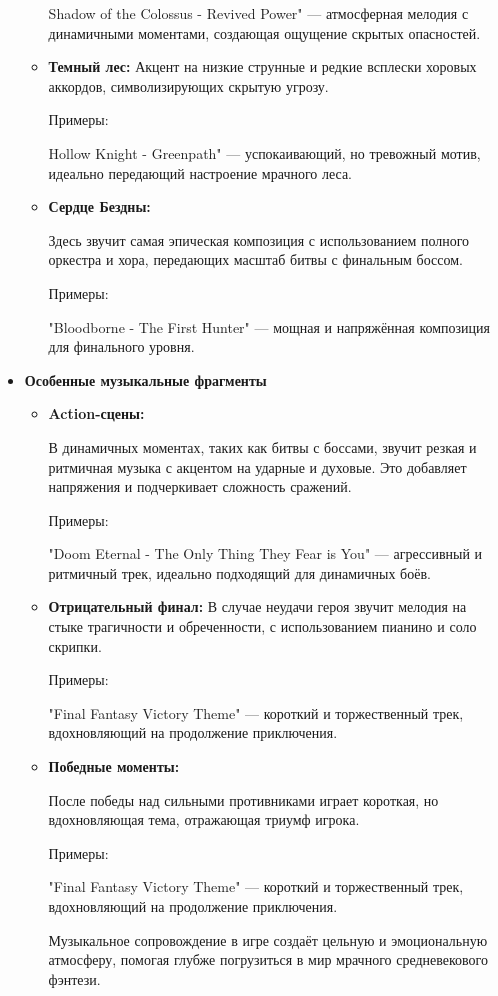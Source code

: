 \documentclass{article}
\begin{document}
\begin{itemize}
\begin{itemize}
Shadow of the Colossus - Revived Power" — атмосферная мелодия с динамичными моментами, создающая ощущение скрытых опасностей.\par
\item \textbf{Темный лес:}
 Акцент на низкие струнные и редкие всплески хоровых аккордов, символизирующих скрытую угрозу.\par
Примеры: \par
Hollow Knight - Greenpath" — успокаивающий, но тревожный мотив, идеально передающий настроение мрачного леса.\par
\item \textbf{Сердце Бездны:}\par
 Здесь звучит самая эпическая композиция с использованием полного оркестра и хора, передающих масштаб битвы с финальным боссом.\par
Примеры: \par
"Bloodborne - The First Hunter" — мощная и напряжённая композиция для финального уровня.\par
\end{itemize}
\item \textbf{Особенные музыкальные фрагменты}\par
\begin{itemize}
\item \textbf{Action-сцены:}\par
В динамичных моментах, таких как битвы с боссами, звучит резкая и ритмичная музыка с акцентом на ударные и духовые. Это добавляет напряжения и подчеркивает сложность сражений.\par
Примеры: \par
"Doom Eternal - The Only Thing They Fear is You" — агрессивный и ритмичный трек, идеально подходящий для динамичных боёв.
\item \textbf{Отрицательный финал:} В случае неудачи героя звучит мелодия на стыке трагичности и обреченности, с использованием пианино и соло скрипки.\par
Примеры: \par
"Final Fantasy Victory Theme" — короткий и торжественный трек, вдохновляющий на продолжение приключения.\par
\item \textbf{Победные моменты:} \par
После победы над сильными противниками играет короткая, но вдохновляющая тема, отражающая триумф игрока.\par
Примеры: \par
"Final Fantasy Victory Theme" — короткий и торжественный трек, вдохновляющий на продолжение приключения.\par
Музыкальное сопровождение в игре создаёт цельную и эмоциональную атмосферу, помогая глубже погрузиться в мир мрачного средневекового фэнтези.\par
\end{itemize}

\end{itemize}
\end{document}

